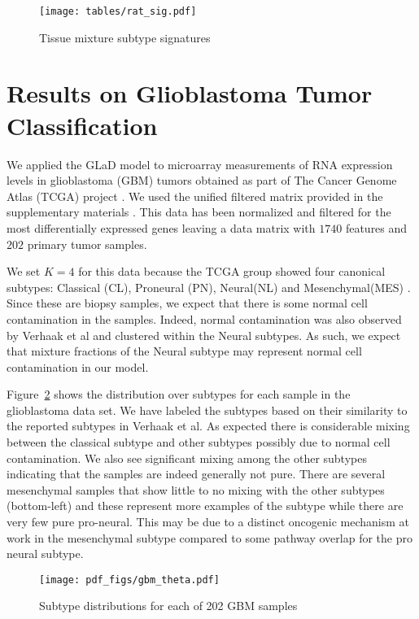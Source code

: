 \documentclass[11pt]{amsart}
\begin{document}
\begin{figure}[htbp]
\begin{center}
\texttt{[image: tables/rat\_sig.pdf]}
\caption{Tissue mixture subtype signatures}
\label{tbl:rat_signature}
\end{center}
\end{figure}


\section{Results on Glioblastoma Tumor Classification}

We applied the GLaD model to microarray measurements of RNA expression levels in glioblastoma (GBM) tumors obtained as part of The Cancer Genome Atlas (TCGA) project \cite{McLendon:2008gr, Verhaak:2010bj}. We used the unified filtered matrix provided in the supplementary materials \cite{Verhaak:2010bj}. This data has been normalized and filtered for the most differentially expressed genes leaving a data matrix with $1740$ features and $202$ primary tumor samples. 

We set $K=4$ for this data because the TCGA group showed four canonical subtypes: Classical (CL), Proneural (PN), Neural(NL) and Mesenchymal(MES) \cite{Verhaak:2010bj}. Since these are biopsy samples, we expect that there is some normal cell contamination in the samples. Indeed, normal contamination was also observed by Verhaak et al and clustered within the Neural subtypes. As such, we expect that mixture fractions of the Neural subtype may represent normal cell contamination in our model.

Figure~\ref{fig:gbm_distribution} shows the distribution over subtypes for each sample in the glioblastoma data set. We have labeled the subtypes based on their similarity to the reported subtypes in Verhaak et al.  As expected there is considerable mixing between the classical subtype and other subtypes possibly due to normal cell contamination. We also see significant mixing among the other subtypes indicating that the samples are indeed generally not pure. There are several mesenchymal samples that show little to no mixing with the other subtypes (bottom-left) and these represent more examples of the subtype while there are very few pure pro-neural. This may be due to a distinct oncogenic mechanism at work in the mesenchymal subtype compared to some pathway overlap for the pro neural subtype.

\begin{figure}[htbp]
\begin{center}
\texttt{[image: pdf\_figs/gbm\_theta.pdf]}
\caption{Subtype distributions for each of 202 GBM samples}
\label{fig:gbm_distribution}
\end{center}
\end{figure}
\end{document}
